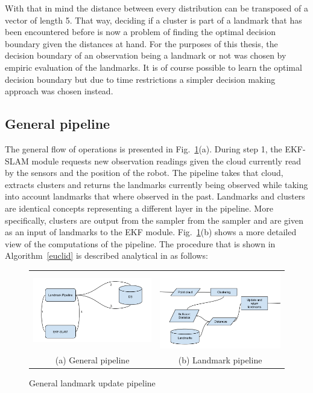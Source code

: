 \documentclass[twoside,hidelinks]{article}
\begin{document}
With that in mind the distance between every distribution can be transposed of a vector of length 5. That way, deciding if a cluster is part of a landmark that has been encountered before is now a problem of finding the optimal decision boundary given the distances at hand. For the purposes of this thesis, the decision boundary of an observation being a landmark or not was chosen by empiric evaluation of the landmarks. It is of course possible to learn the optimal decision boundary but due to time restrictions a simpler decision making approach was chosen instead.


\subsection{General pipeline}

The general flow of operations is presented in Fig.~\ref{pipeline}(a). During step 1, the EKF-SLAM module requests new observation readings given the cloud currently read by the sensors and the position of the robot. The pipeline takes that cloud, extracts clusters and returns the landmarks currently being observed while taking into account landmarks that where observed in the past. Landmarks and clusters are identical concepts representing a different layer in the pipeline. More specifically, clusters are output from the sampler from the sampler and are given as an input of landmarks to the EKF module. Fig.~\ref{pipeline}(b) shows a more detailed view of the computations of the pipeline. The procedure that is shown in Algorithm~\ref{euclid} is described analytical in as follows:


\begin{figure}
\begin{tabular}{cc}
  \includegraphics[width=65mm]{workflowGen} &    \includegraphics[width=65mm]{workflowSpec} \\
(a) General pipeline & (b) Landmark pipeline \\[6pt]
\end{tabular}
\caption{General landmark update pipeline}
\label{pipeline}
\end{figure}
\end{document}
